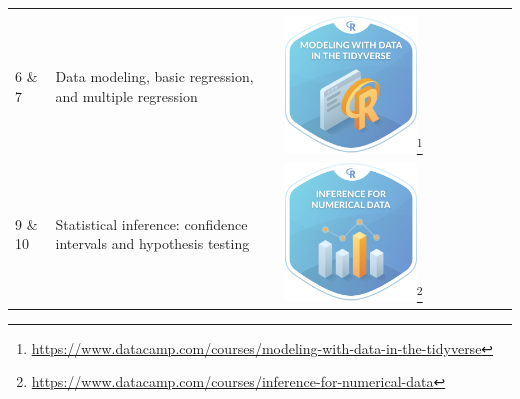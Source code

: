 \documentclass[12pt,]{krantz}
\renewcommand{\href}[2]{#2\footnote{\url{#1}}}
\theoremstyle{definition}
\theoremstyle{definition}
\theoremstyle{definition}
\theoremstyle{remark}
\begin{document}
\begin{longtable}[]{@{}lll@{}}
\begin{minipage}[t]{0.30\columnwidth}
\end{minipage}\tabularnewline
\begin{minipage}[t]{0.30\columnwidth}\raggedright\strut
6 \& 7\strut
\end{minipage} & \begin{minipage}[t]{0.30\columnwidth}\raggedright\strut
Data modeling, basic regression, and multiple regression\strut
\end{minipage} & \begin{minipage}[t]{0.30\columnwidth}\raggedright\strut
\href{https://www.datacamp.com/courses/modeling-with-data-in-the-tidyverse}{\includegraphics[width=0.6\textwidth]{images/datacamp_intro_to_modeling.png}}\strut
\end{minipage}\tabularnewline
\begin{minipage}[t]{0.30\columnwidth}\raggedright\strut
9 \& 10\strut
\end{minipage} & \begin{minipage}[t]{0.30\columnwidth}\raggedright\strut
Statistical inference: confidence intervals and hypothesis testing\strut
\end{minipage} & \begin{minipage}[t]{0.30\columnwidth}\raggedright\strut
\href{https://www.datacamp.com/courses/inference-for-numerical-data}{\includegraphics[width=0.6\textwidth]{images/datacamp_inference_for_numerical_data.png}}

\end{minipage}
\end{longtable}
\end{document}

